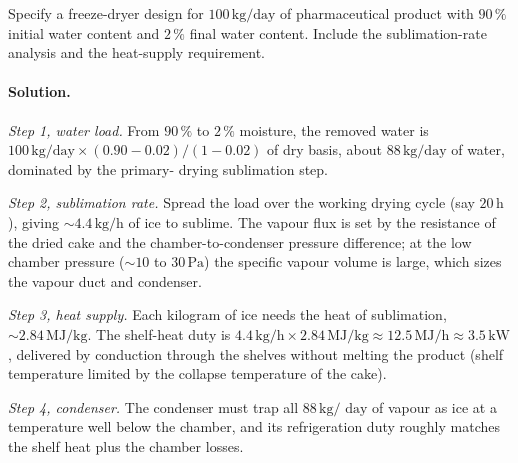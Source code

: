 \begin{exercise}
Specify a freeze-dryer design for $100\,\text{kg/day}$ of
pharmaceutical product with $90\,\%$ initial water content and
$2\,\%$ final water content. Include the sublimation-rate analysis
and the heat-supply requirement.

\paragraph{Solution.}
\textit{Step 1, water load.} From $90\,\%$ to $2\,\%$ moisture, the
removed water is $100\,\text{kg/day}\times(0.90-0.02)/(1-0.02)$ of dry
basis, about $88\,\text{kg/day}$ of water, dominated by the primary-
drying sublimation step.

\textit{Step 2, sublimation rate.} Spread the load over the working
drying cycle (say $20\,\text{h}$), giving $\sim 4.4\,\text{kg/h}$ of
ice to sublime. The vapour flux is set by the resistance of the dried
cake and the chamber-to-condenser pressure difference; at the low
chamber pressure ($\sim 10$ to $30\,\text{Pa}$) the specific vapour
volume is large, which sizes the vapour duct and condenser.

\textit{Step 3, heat supply.} Each kilogram of ice needs the heat of
sublimation, $\sim 2.84\,\text{MJ/kg}$. The shelf-heat duty is
$4.4\,\text{kg/h}\times 2.84\,\text{MJ/kg} \approx 12.5\,\text{MJ/h}
\approx 3.5\,\text{kW}$, delivered by conduction through the shelves
without melting the product (shelf temperature limited by the collapse
temperature of the cake).

\textit{Step 4, condenser.} The condenser must trap all $88\,\text{kg/
day}$ of vapour as ice at a temperature well below the chamber, and its
refrigeration duty roughly matches the shelf heat plus the chamber
losses.
\end{exercise}

